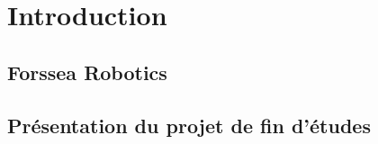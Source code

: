 \chapter{Introduction}
	
	\section{Forssea Robotics}

		

	\section{Présentation du projet de fin d'études}

		
	